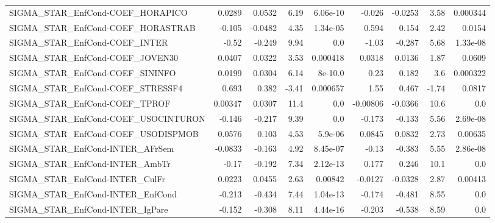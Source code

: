 \begin{tabular}{lrrrrrrrr}
SIGMA\_STAR\_EnfCond-COEF\_HORAPICO      &      0.0289 &       0.0532 &    6.19 & 6.06e-10 &     -0.026 &     -0.0253 &         3.58 &      0.000344 \\
SIGMA\_STAR\_EnfCond-COEF\_HORASTRAB     &      -0.105 &      -0.0482 &    4.35 & 1.34e-05 &      0.594 &       0.154 &         2.42 &        0.0154 \\
SIGMA\_STAR\_EnfCond-COEF\_INTER         &       -0.52 &       -0.249 &    9.94 &      0.0 &      -1.03 &      -0.287 &         5.68 &      1.33e-08 \\
SIGMA\_STAR\_EnfCond-COEF\_JOVEN30       &      0.0407 &       0.0322 &    3.53 & 0.000418 &     0.0318 &      0.0136 &         1.87 &        0.0609 \\
SIGMA\_STAR\_EnfCond-COEF\_SININFO       &      0.0199 &       0.0304 &    6.14 &  8e-10.0 &       0.23 &       0.182 &          3.6 &      0.000322 \\
SIGMA\_STAR\_EnfCond-COEF\_STRESSF4      &       0.693 &        0.382 &   -3.41 & 0.000657 &       1.55 &       0.467 &        -1.74 &        0.0817 \\
SIGMA\_STAR\_EnfCond-COEF\_TPROF         &     0.00347 &       0.0307 &    11.4 &      0.0 &   -0.00806 &     -0.0366 &         10.6 &           0.0 \\
SIGMA\_STAR\_EnfCond-COEF\_USOCINTURON   &      -0.146 &       -0.217 &    9.39 &      0.0 &     -0.173 &      -0.133 &         5.56 &      2.69e-08 \\
SIGMA\_STAR\_EnfCond-COEF\_USODISPMOB    &      0.0576 &        0.103 &    4.53 &  5.9e-06 &     0.0845 &      0.0832 &         2.73 &       0.00635 \\
SIGMA\_STAR\_EnfCond-INTER\_AFrSem       &     -0.0833 &       -0.163 &    4.92 & 8.45e-07 &      -0.13 &      -0.383 &         5.55 &      2.86e-08 \\
SIGMA\_STAR\_EnfCond-INTER\_AmbTr        &       -0.17 &       -0.192 &    7.34 & 2.12e-13 &      0.177 &       0.246 &         10.1 &           0.0 \\
SIGMA\_STAR\_EnfCond-INTER\_CulFr        &      0.0223 &       0.0455 &    2.63 &  0.00842 &    -0.0127 &     -0.0328 &         2.87 &       0.00413 \\
SIGMA\_STAR\_EnfCond-INTER\_EnfCond      &      -0.213 &       -0.434 &    7.44 & 1.04e-13 &     -0.174 &      -0.481 &         8.55 &           0.0 \\
SIGMA\_STAR\_EnfCond-INTER\_IgPare       &      -0.152 &       -0.308 &    8.11 & 4.44e-16 &     -0.203 &      -0.538 &         8.59 &           0.0 \\

\end{tabular}

